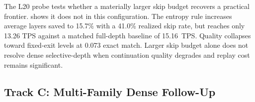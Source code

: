 \documentclass[11pt]{article}
\begin{document}
\begin{table}[t]
\centering
\small
\caption{Selective-depth probe at L20 on the same expository subset, testing whether a larger skip budget recovers a practical frontier.}
\label{tab:trackc_selective_l20}
\end{table}

The L20 probe tests whether a materially larger skip budget recovers a practical frontier.  shows it does not in this configuration. The entropy rule increases average layers saved to 15.7\% with a 41.0\% realized skip rate, but reaches only 13.26 TPS against a matched full-depth baseline of 15.16~TPS. Quality collapses toward fixed-exit levels at 0.073 exact match. Larger skip budget alone does not resolve dense selective-depth when continuation quality degrades and replay cost remains significant.

\subsection{Track C: Multi-Family Dense Follow-Up}

\begin{table}[t]
\centering
\small
\caption{Late-checkpoint dense-family follow-up on the shared expository subset ($P2$--$P5$ scored after warmup) on the local Apple MLX runtime.}
\label{tab:trackc_multifamily}
\end{table}
\end{document}
